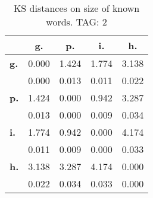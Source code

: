 \begin{table}[h!]
\begin{center}
\begin{tabular}{| l || c | c | c | c |}\hline
 & {\bf g.} & {\bf p.} & {\bf i.} & {\bf h.} \\\hline\hline
{\bf g.} & 0.000 & 1.424 & 1.774 & 3.138 \\
{\bf } & 0.000 & 0.013 & 0.011 & 0.022 \\\hline
{\bf p.} & 1.424 & 0.000 & 0.942 & 3.287 \\
{\bf } & 0.013 & 0.000 & 0.009 & 0.034 \\\hline
{\bf i.} & 1.774 & 0.942 & 0.000 & 4.174 \\
{\bf } & 0.011 & 0.009 & 0.000 & 0.033 \\\hline
{\bf h.} & 3.138 & 3.287 & 4.174 & 0.000 \\
{\bf } & 0.022 & 0.034 & 0.033 & 0.000 \\\hline
\end{tabular}
\caption{KS distances on size of known words. TAG: 2}
\end{center}
\end{table}